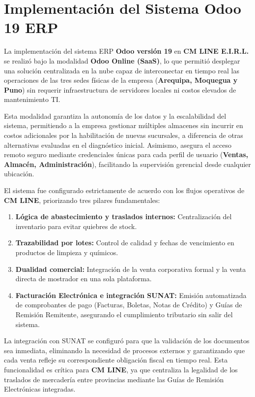 \section{Implementación del Sistema Odoo 19 ERP}

La implementación del sistema ERP \textbf{Odoo versión 19} en \textbf{CM LINE E.I.R.L.} se realizó bajo la modalidad \textbf{Odoo Online (SaaS)}, lo que permitió desplegar una solución centralizada en la nube capaz de interconectar en tiempo real las operaciones de las tres sedes físicas de la empresa (\textbf{Arequipa, Moquegua y Puno}) sin requerir infraestructura de servidores locales ni costos elevados de mantenimiento TI.

Esta modalidad garantiza la autonomía de los datos y la escalabilidad del sistema, permitiendo a la empresa gestionar múltiples almacenes sin incurrir en costos adicionales por la habilitación de nuevas sucursales, a diferencia de otras alternativas evaluadas en el diagnóstico inicial. Asimismo, asegura el acceso remoto seguro mediante credenciales únicas para cada perfil de usuario (\textbf{Ventas, Almacén, Administración}), facilitando la supervisión gerencial desde cualquier ubicación.

El sistema fue configurado estrictamente de acuerdo con los flujos operativos de \textbf{CM LINE}, priorizando tres pilares fundamentales:

\begin{enumerate}
    \item \textbf{Lógica de abastecimiento y traslados internos:} Centralización del inventario para evitar quiebres de stock.
    \item \textbf{Trazabilidad por lotes:} Control de calidad y fechas de vencimiento en productos de limpieza y químicos.
    \item \textbf{Dualidad comercial:} Integración de la venta corporativa formal y la venta directa de mostrador en una sola plataforma.
    \item \textbf{Facturación Electrónica e integración SUNAT:} Emisión automatizada de comprobantes de pago (Facturas, Boletas, Notas de Crédito) y Guías de Remisión Remitente, asegurando el cumplimiento tributario sin salir del sistema.
\end{enumerate}

La integración con SUNAT se configuró para que la validación de los documentos sea inmediata, eliminando la necesidad de procesos externos y garantizando que cada venta refleje su correspondiente obligación fiscal en tiempo real. Esta funcionalidad es crítica para \textbf{CM LINE}, ya que centraliza la legalidad de los traslados de mercadería entre provincias mediante las Guías de Remisión Electrónicas integradas.

